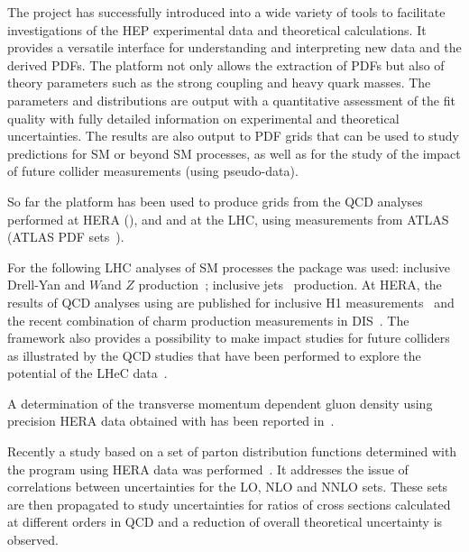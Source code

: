 The \fitter project has successfully introduced into a wide variety
of tools to facilitate investigations of the HEP experimental data
and theoretical calculations. It provides a versatile interface
for understanding and interpreting new data and the derived PDFs.
The \fitter platform not only allows the extraction of PDFs but also of theory 
parameters such as the strong coupling and heavy quark masses. The parameters and distributions are output with a
quantitative assessment of the fit quality with fully detailed information on 
experimental and theoretical uncertainties.
The results are also output to PDF \lhapdf grids that can be used to study predictions for SM or beyond SM processes, as well as for the study of the impact of 
future collider measurements (using pseudo-data).


So far the \fitter platform has been used to produce grids 
from the QCD analyses performed at 
HERA (\cite{h1zeus:2009wt}), and and at the LHC, using 
measurements from ATLAS~\cite{atlas:strange,atlas:jets} (ATLAS PDF sets~\cite{atlas:grids}).

For the following LHC analyses of SM processes 
the \fitter package was used:
inclusive Drell-Yan and $W$and $Z$ 
production~\cite{atlas:strange,atlas:hm,cms:strange};
inclusive jets~\cite{atlas:jets,cms:jets} production.
At HERA, the results of QCD analyses using \fitter are 
published for inclusive H1 measurements~\cite{h1:2012kk}
and the recent combination of charm production measurements 
in DIS~\cite{h1zeus:charm}.
The \fitter framework also provides a possibility to 
make impact studies for future colliders
as illustrated by the QCD studies that have been performed to 
explore the potential of the LHeC data~\cite{lhec:studies}.

A determination of the transverse momentum dependent gluon density using precision HERA
data obtained with \fitter has been reported in~\cite{Jung2014}. 

Recently a study based on a set of parton distribution functions 
determined with the \fitter program using HERA data was performed~\cite{hfcorrpaper}.
It addresses the issue of correlations between uncertainties for the LO,
NLO and NNLO sets. These sets are then propagated to study uncertainties 
for ratios of cross sections calculated at different orders in QCD and  
a reduction of overall theoretical uncertainty is observed.

